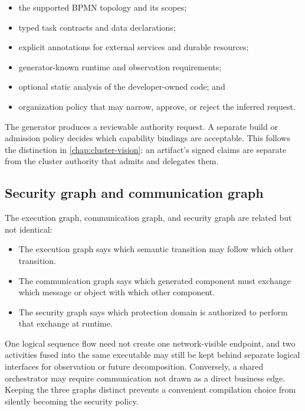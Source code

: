 \begin{itemize}
    \item the supported BPMN topology and its scopes;
    \item typed task contracts and data declarations;
    \item explicit annotations for external services and durable resources;
    \item generator-known runtime and observation requirements;
    \item optional static analysis of the developer-owned code; and
    \item organization policy that may narrow, approve, or reject the inferred
        request.
\end{itemize}

The generator produces a reviewable authority request. A separate build or
admission policy decides which capability bindings are acceptable. This follows
the distinction in \autoref{chap:cluster-vision}: an artifact's signed claims
are separate from the cluster authority that admits and delegates them.

\subsection{Security graph and communication graph}

The execution graph, communication graph, and security graph are related but
not identical:

\begin{itemize}
    \item The execution graph says which semantic transition may follow which
        other transition.

    \item The communication graph says which generated component must exchange
        which message or object with which other component.

    \item The security graph says which protection domain is authorized to
        perform that exchange at runtime.
\end{itemize}

One logical sequence flow need not create one network-visible endpoint, and two
activities fused into the same executable may still be kept behind separate
logical interfaces for observation or future decomposition. Conversely, a
shared orchestrator may require communication not drawn as a direct business
edge. Keeping the three graphs distinct prevents a convenient compilation
choice from silently becoming the security policy.

